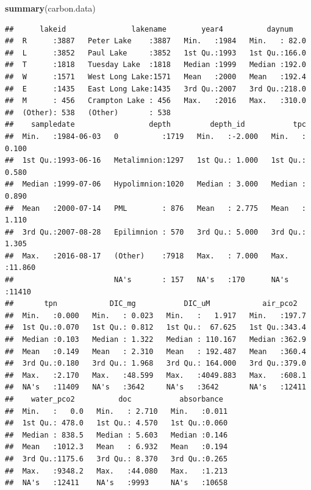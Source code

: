 \documentclass[12pt,]{article}
\newenvironment{Shaded}{\begin{snugshade}}{\end{snugshade}}
\newcommand{\KeywordTok}[1]{\textcolor[rgb]{0.13,0.29,0.53}{\textbf{#1}}}
\newcommand{\NormalTok}[1]{#1}
\begin{document}
\begin{Shaded}
\begin{Highlighting}[]
\KeywordTok{summary}\NormalTok{(carbon.data)}
\end{Highlighting}
\end{Shaded}

\begin{verbatim}
##      lakeid               lakename        year4          daynum     
##  R      :3887   Peter Lake    :3887   Min.   :1984   Min.   : 82.0  
##  L      :3852   Paul Lake     :3852   1st Qu.:1993   1st Qu.:166.0  
##  T      :1818   Tuesday Lake  :1818   Median :1999   Median :192.0  
##  W      :1571   West Long Lake:1571   Mean   :2000   Mean   :192.4  
##  E      :1435   East Long Lake:1435   3rd Qu.:2007   3rd Qu.:218.0  
##  M      : 456   Crampton Lake : 456   Max.   :2016   Max.   :310.0  
##  (Other): 538   (Other)       : 538                                 
##    sampledate                 depth         depth_id           tpc        
##  Min.   :1984-06-03   0          :1719   Min.   :-2.000   Min.   : 0.100  
##  1st Qu.:1993-06-16   Metalimnion:1297   1st Qu.: 1.000   1st Qu.: 0.580  
##  Median :1999-07-06   Hypolimnion:1020   Median : 3.000   Median : 0.890  
##  Mean   :2000-07-14   PML        : 876   Mean   : 2.775   Mean   : 1.110  
##  3rd Qu.:2007-08-28   Epilimnion : 570   3rd Qu.: 5.000   3rd Qu.: 1.305  
##  Max.   :2016-08-17   (Other)    :7918   Max.   : 7.000   Max.   :11.860  
##                       NA's       : 157   NA's   :170      NA's   :11410   
##       tpn            DIC_mg           DIC_uM            air_pco2    
##  Min.   :0.000   Min.   : 0.023   Min.   :   1.917   Min.   :197.7  
##  1st Qu.:0.070   1st Qu.: 0.812   1st Qu.:  67.625   1st Qu.:343.4  
##  Median :0.103   Median : 1.322   Median : 110.167   Median :362.9  
##  Mean   :0.149   Mean   : 2.310   Mean   : 192.487   Mean   :360.4  
##  3rd Qu.:0.180   3rd Qu.: 1.968   3rd Qu.: 164.000   3rd Qu.:379.0  
##  Max.   :2.170   Max.   :48.599   Max.   :4049.883   Max.   :608.1  
##  NA's   :11409   NA's   :3642     NA's   :3642       NA's   :12411  
##    water_pco2          doc           absorbance   
##  Min.   :   0.0   Min.   : 2.710   Min.   :0.011  
##  1st Qu.: 478.0   1st Qu.: 4.570   1st Qu.:0.060  
##  Median : 838.5   Median : 5.603   Median :0.146  
##  Mean   :1012.3   Mean   : 6.932   Mean   :0.194  
##  3rd Qu.:1175.6   3rd Qu.: 8.370   3rd Qu.:0.265  
##  Max.   :9348.2   Max.   :44.080   Max.   :1.213  
##  NA's   :12411    NA's   :9993     NA's   :10658
\end{verbatim}
\end{document}
